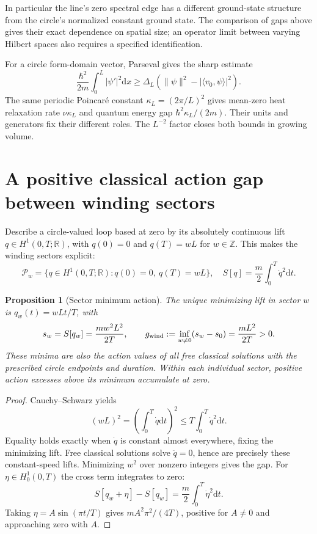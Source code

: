 \documentclass[11pt,a4paper]{article}
\newtheorem{proposition}{Proposition}
\newcommand{\dd}{\mathrm{d}}
\newcommand{\R}{\mathbb R}
\newcommand{\Z}{\mathbb Z}
\begin{document}
In particular the line's zero spectral edge has a different ground-state
structure from the circle's normalized constant ground state. The comparison
of gaps above gives their exact dependence on spatial size; an operator limit
between varying Hilbert spaces also requires a specified identification.

For a circle form-domain vector, Parseval gives the sharp estimate
\begin{equation}\label{eq:circle-coercivity}
 \frac{\hbar^2}{2m}\int_0^L|\psi'|^2\dd x
 \ge\Delta_L\left(\|\psi\|^2-|\langle v_0,\psi\rangle|^2\right).
\end{equation}
The same periodic Poincar\'e constant $\kappa_L=(2\pi/L)^2$ gives mean-zero
heat relaxation rate $\nu\kappa_L$ and quantum energy gap
$\hbar^2\kappa_L/(2m)$. Their units and generators fix their different roles.
The $L^{-2}$ factor closes both bounds in growing volume.

\section{A positive classical action gap between winding sectors}
Describe a circle-valued loop based at zero by its absolutely continuous lift
$q\in H^1(0,T;\R)$, with $q(0)=0$ and $q(T)=wL$ for $w\in\Z$.
This makes the winding sectors explicit:
\[
 \mathcal P_w=\{q\in H^1(0,T;\R):q(0)=0,\ q(T)=wL\},
 \quad S[q]=\frac m2\int_0^T\dot q^2\dd t.
\]

\begin{proposition}[Sector minimum action]\label{prop:winding}
The unique minimizing lift in sector $w$ is $q_w(t)=wLt/T$, with
\[
 s_w=S[q_w]=\frac{mw^2L^2}{2T},\qquad
 g_{\rm wind}:=\inf_{w\ne0}(s_w-s_0)=\frac{mL^2}{2T}>0.
\]
These minima are also the action values of all free classical solutions with
the prescribed circle endpoints and duration. Within each individual sector,
positive action excesses above its minimum accumulate at zero.
\end{proposition}
\begin{proof}
Cauchy--Schwarz yields
\[
 (wL)^2=\left(\int_0^T\dot q\dd t\right)^2
 \le T\int_0^T\dot q^2\dd t.
\]
Equality holds exactly when $\dot q$ is constant almost everywhere, fixing
the minimizing lift. Free classical solutions solve $\ddot q=0$, hence are
precisely these constant-speed lifts. Minimizing $w^2$ over nonzero integers
gives the gap. For $\eta\in H^1_0(0,T)$ the cross term integrates to zero:
\[
 S[q_w+\eta]-S[q_w]=\frac m2\int_0^T\dot\eta^2\dd t.
\]
Taking $\eta=A\sin(\pi t/T)$ gives $mA^2\pi^2/(4T)$, positive for $A\ne0$
and approaching zero with $A$.
\end{proof}
\end{document}
